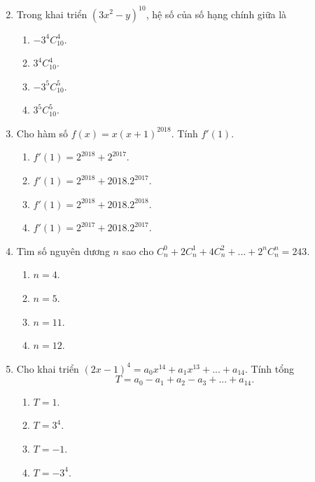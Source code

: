 \begin{enumerate}[label=\textbf{Câu \arabic*.},align=left,left=0cm..0cm,itemindent=*]
\begin{multicols}{4}
\begin{enumerate}[label=\textbf{\Alph*.},align=left,left=1cm..0cm,itemindent=*]
	\end{enumerate}\end{multicols}
	\item Trong khai triển $\left(3x^2-y\right)^{10}$, hệ số của số hạng chính giữa là
	\begin{multicols}{4}\begin{enumerate}[label=\textbf{\Alph*.},align=left,left=1cm..0cm,itemindent=*]
		\item $-3^4C_{10}^4$. \item $3^4C_{10}^4$. \item $-3^5C_{10}^5$. \item $3^5C_{10}^5$.
	\end{enumerate}\end{multicols}
	\item Cho hàm số $f(x)=x(x+1)^{2018}$. Tính $f'(1)$.
	\begin{enumerate}[label=\textbf{\Alph*.},align=left,left=1cm..0cm,itemindent=*]
		\item $f'(1)=2^{2018}+2^{2017}$.
		\item $f'(1)=2^{2018}+2018.2^{2017}$.
		\item $f'(1)=2^{2018}+2018.2^{2018}$.
		\item $f'(1)=2^{2017}+2018.2^{2017}$.
	\end{enumerate}
	\item Tìm số nguyên dương $n$ sao cho $C_n^0+2C_n^1+4C_n^2+...+2^nC_n^n=243$.
	\begin{multicols}{4}\begin{enumerate}[label=\textbf{\Alph*.},align=left,left=1cm..0cm,itemindent=*]
		\item $n=4$. \item $n=5$. \item $n=11$. \item $n=12$.
	\end{enumerate}\end{multicols}
	\item Cho khai triển $(2x-1)^4=a_0x^{14}+a_1x^{13}+...+a_{14}$. Tính tổng $$T=a_0-a_1+a_2-a_3+...+a_{14}.$$
	\begin{multicols}{4}\begin{enumerate}[label=\textbf{\Alph*.},align=left,left=1cm..0cm,itemindent=*]
		\item $T=1$. \item $T=3^4$. \item $T=-1$. \item $T=-3^4$.
	\end{enumerate}\end{multicols}

\end{enumerate}
